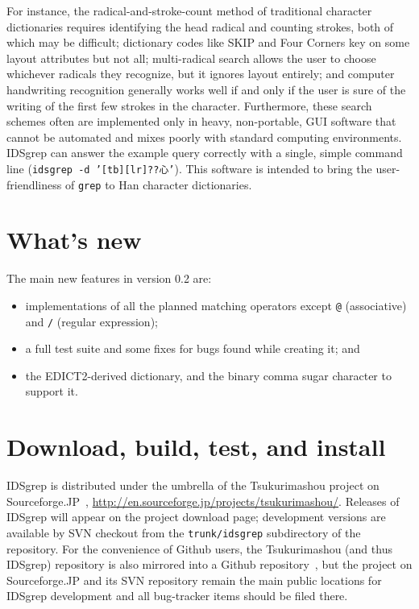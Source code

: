 \documentclass[twocolumn]{report}
\begin{document}
For instance, the radical-and-stroke-count method of traditional character
dictionaries requires identifying the head radical and counting strokes,
both of which may be difficult; dictionary codes like SKIP and Four Corners
key on some layout attributes but not all; multi-radical search allows the
user to choose whichever radicals they recognize, but it ignores layout
entirely; and computer handwriting recognition generally works well if and
only if the user is sure of the writing of the first few strokes in the
character.  Furthermore, these search schemes often are implemented only in
heavy, non-portable, GUI software that cannot be automated and mixes poorly
with standard computing environments.  IDSgrep can answer the example query
correctly with a single, simple command line (\texttt{idsgrep -d
'[tb][lr]??心'}).  This software is intended to bring the user-friendliness
of \texttt{grep} to Han character dictionaries.


\section{What's new}

The main new features in version 0.2 are:
\begin{itemize}
\item implementations of all the planned matching operators except
  \texttt{@} (associative) and \texttt{/} (regular expression);
\item a full test suite and some fixes for bugs found while creating it; and
\item the EDICT2-derived dictionary, and the binary comma sugar
  character to support it.
\end{itemize}


\section{Download, build, test, and install}

IDSgrep is distributed under the umbrella of the Tsukurimashou project on
Sourceforge.JP~\cite{Tsukurimashou},
\url{http://en.sourceforge.jp/projects/tsukurimashou/}.  Releases of IDSgrep
will appear on the project download page; development versions are available
by SVN checkout from the \texttt{trunk/idsgrep} subdirectory of the
repository.  For the convenience of Github users, the Tsukurimashou (and
thus IDSgrep) repository is also mirrored into a Github
repository~\cite{TsukuGithub}, but the project on Sourceforge.JP and its SVN
repository remain the main public locations for IDSgrep development and all
bug-tracker items should be filed there.
\end{document}
